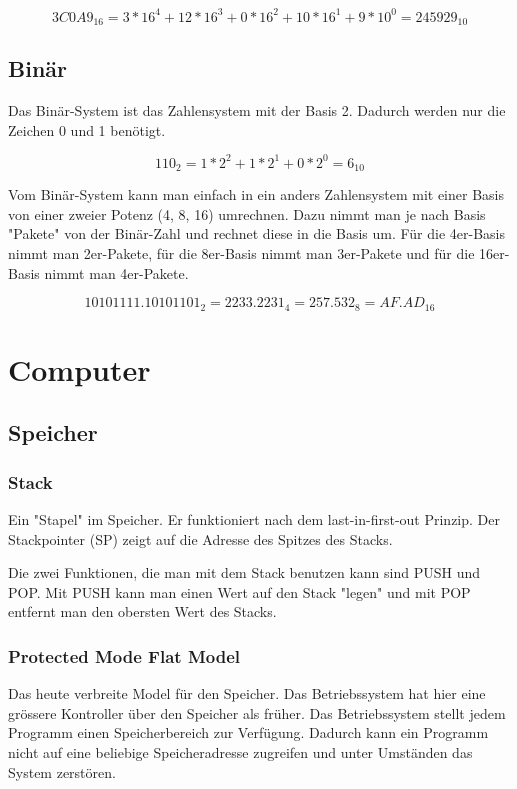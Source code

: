 \documentclass[12pt, a4paper, oneside]{article}
\begin{document}
\begin{equation}
  3C0A9_{16} = 3 * 16^{4} + 12 * 16^{3} + 0 * 16^{2} + 10 * 16^{1} + 9 * 10^{0} = 245929_{10}
\end{equation}

\subsection{Binär}
Das Binär-System ist das Zahlensystem mit der Basis 2. Dadurch werden nur die Zeichen 0 und 1 benötigt.

\begin{equation}
  110_{2} = 1 * 2^{2} + 1* 2^{1} + 0 * 2^{0} = 6_{10}
\end{equation}

Vom Binär-System kann man einfach in ein anders Zahlensystem mit einer Basis von einer zweier Potenz (4, 8, 16) umrechnen. Dazu nimmt man je nach Basis "Pakete" von der Binär-Zahl und rechnet diese in die Basis um. Für die 4er-Basis nimmt man 2er-Pakete, für die 8er-Basis nimmt man 3er-Pakete und für die 16er-Basis nimmt man 4er-Pakete. 

\begin{equation}
  10101111.10101101_{2} = 2233.2231_{4} = 257.532_{8} = AF.AD_{16}
\end{equation}

\section{Computer}
\subsection{Speicher}
\subsubsection{Stack}
Ein "Stapel" im Speicher. Er funktioniert nach dem last-in-first-out Prinzip. Der Stackpointer (SP) zeigt auf die Adresse des Spitzes des Stacks.

Die zwei Funktionen, die man mit dem Stack benutzen kann sind PUSH und POP. Mit PUSH kann man einen Wert auf den Stack "legen" und mit POP entfernt man den obersten Wert des Stacks. 

\subsubsection{Protected Mode Flat Model}
Das heute verbreite Model für den Speicher. Das Betriebssystem hat hier eine grössere Kontroller über den Speicher als früher. Das Betriebssystem stellt jedem Programm einen Speicherbereich zur Verfügung. Dadurch kann ein Programm nicht auf eine beliebige Speicheradresse zugreifen und unter Umständen das System zerstören.
\end{document}

